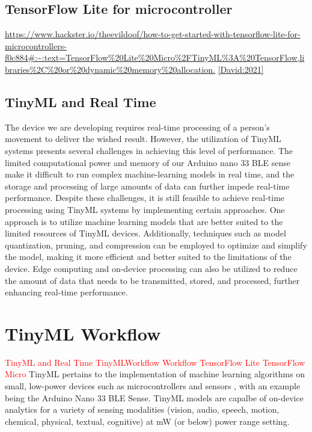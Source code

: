 \subsection{TensorFlow Lite for microcontroller}
\url{https://www.hackster.io/theevildoof/how-to-get-started-with-tensorflow-lite-for-microcontrollers-f0c884#:~:text=TensorFlow%20Lite%20Micro%2FTinyML%3A%20TensorFlow,libraries%2C%20or%20dynamic%20memory%20allocation.}
\ref{David:2021}
\subsection{TinyML and Real Time}

The device we are developing requires real-time processing of a person's movement to deliver the wished result. 
However, the utilization of TinyML systems presents several challenges in achieving this level of performance. The limited computational power and memory of our Arduino nano 33 BLE sense make it difficult to run complex machine-learning models in real time, and the storage and processing of large amounts of data can further impede real-time performance. 
Despite these challenges, it is still feasible to achieve real-time processing using TinyML systems by implementing certain approaches. 
One approach is to utilize machine learning models that are better suited to the limited resources of TinyML devices.
Additionally, techniques such as model quantization, pruning, and compression can be employed to optimize and simplify the model, making it more efficient and better suited to the limitations of the device.
Edge computing and on-device processing can also be utilized to reduce the amount of data that needs to be transmitted, stored, and processed, further enhancing real-time performance.
\section{TinyML Workflow}

\textcolor{red}{TinyML and Real Time}
\textcolor{red}{TinyMLWorkflow}
\textcolor{red}{Workflow}  
\textcolor{red}{TensorFlow Lite} 	\textcolor{red}{TensorFlow Micro} 
TinyML pertains to the implementation of machine learning algorithms on small, low-power devices such as microcontrollers and sensors \cite{David:2021}, with an example being the Arduino Nano 33 BLE Sense. 
TinyML models are capalbe of on-device analytics for a variety of sensing modalities (vision, audio, speech, motion, chemical, physical, textual, cognitive) at mW (or below) power range setting. \cite{Ray:2021}
%



